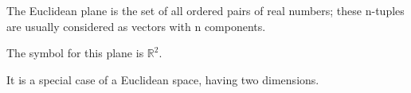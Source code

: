 The Euclidean plane is the set of all ordered pairs of real numbers;  
these n-tuples are usually considered as vectors with n components.  
\par
The symbol for this plane is $ \mathbb{R}^2 . $  
\par
It is a special case of a Euclidean space, having two dimensions.